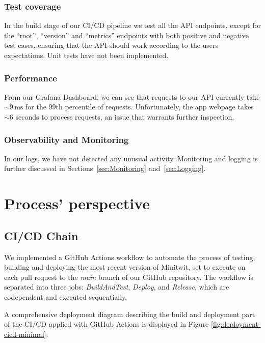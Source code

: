 \documentclass[12pt, a4paper, oneside]{book}
\begin{document}
\subsection{Test coverage}

In the build stage of our CI/CD pipeline we test all the API endpoints, except for the “root”, “version” and “metrics” endpoints with both positive and negative test cases, ensuring that the API should work according to the users expectations. Unit tests have not been implemented.

\subsection{Performance}

From our Grafana Dashboard, we can see that requests to our API currently take $\sim 9\,\text{ms}
$ for the $99\text{th}$ percentile of requests. Unfortunately, the app webpage takes $\sim 6$ seconds to process requests, an issue that warrants further inspection.

\subsection{Observability and Monitoring}
In our logs, we have not detected any unusual activity. Monitoring and logging is further discussed in Sections~\ref{sec:Monitoring} and~\ref{sec:Logging}.

\chapter{Process' perspective}

\section{CI/CD Chain}
We implemented a GitHub Actions workflow to automate the process of testing, building and deploying the most recent version of Minitwit, set to execute on each pull request to the \textit{main} branch of our GitHub repository.
The workflow is separated into three jobs: \textit{BuildAndTest}, \textit{Deploy}, and \textit{Release}, which are codependent and executed sequentially,  \bigskip

A comprehensive deployment diagram describing the build and deployment part of the CI/CD applied with GitHub Actions is displayed in Figure \ref{fig:deployment-cicd-minimal}.\bigskip
\end{document}
